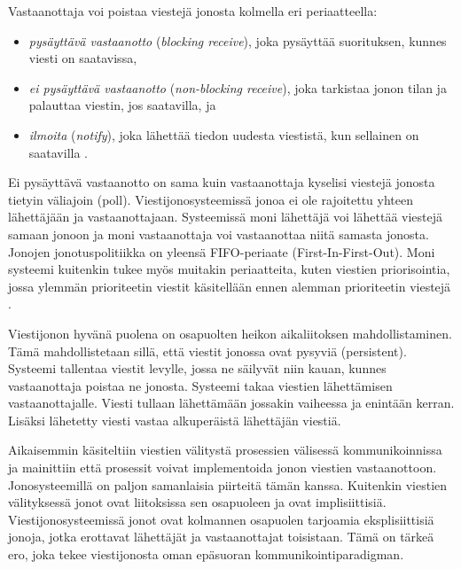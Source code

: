 Vastaanottaja voi poistaa viestejä jonosta kolmella eri periaatteella:
\begin{itemize}
	\item \emph{pysäyttävä vastaanotto} (\emph{blocking receive}), joka pysäyttää suorituksen, kunnes viesti on saatavissa,
	\item \emph{ei pysäyttävä vastaanotto} (\emph{non-blocking receive}), joka tarkistaa jonon tilan ja palauttaa viestin, jos saatavilla, ja
	\item \emph{ilmoita} (\emph{notify}), joka lähettää tiedon uudesta viestistä, kun sellainen on saatavilla \cite[s.~254]{distributed-systems-concepts-and-design}.
\end{itemize}
Ei pysäyttävä vastaanotto on sama kuin vastaanottaja kyselisi viestejä jonosta tietyin väliajoin (poll). Viestijonosysteemissä jonoa ei ole rajoitettu yhteen lähettäjään ja vastaanottajaan. Systeemissä moni lähettäjä voi lähettää viestejä samaan jonoon ja moni vastaanottaja voi vastaanottaa niitä samasta jonosta. Jonojen jonotuspolitiikka on yleensä FIFO-periaate (First-In-First-Out). Moni systeemi kuitenkin tukee myös muitakin periaatteita, kuten viestien priorisointia, jossa ylemmän prioriteetin viestit käsitellään ennen alemman prioriteetin viestejä \cite[s.~120]{eugster2003many}.

Viestijonon hyvänä puolena on osapuolten heikon aikaliitoksen mahdollistaminen. Tämä mahdollistetaan sillä, että viestit jonossa ovat pysyviä (persistent). Systeemi tallentaa viestit levylle, jossa ne säilyvät niin kauan, kunnes vastaanottaja poistaa ne jonosta. Systeemi takaa viestien lähettämisen vastaanottajalle. Viesti tullaan lähettämään jossakin vaiheessa ja enintään kerran. Lisäksi lähetetty viesti vastaa alkuperäistä lähettäjän viestiä. \mbox{\cite[s.~255]{distributed-systems-concepts-and-design}}

Aikaisemmin käsiteltiin viestien välitystä prosessien välisessä kommunikoinnissa ja mainittiin että prosessit voivat implementoida jonon viestien vastaanottoon. Jonosysteemillä on paljon samanlaisia piirteitä tämän kanssa. Kuitenkin viestien välityksessä jonot ovat liitoksissa sen osapuoleen ja ovat implisiittisiä. Viestijonosysteemissä jonot ovat kolmannen osapuolen tarjoamia eksplisiittisiä jonoja, jotka erottavat lähettäjät ja vastaanottajat toisistaan. Tämä on tärkeä ero, joka tekee viestijonosta oman epäsuoran kommunikointiparadigman. \mbox{\cite[s.~256]{distributed-systems-concepts-and-design}}

